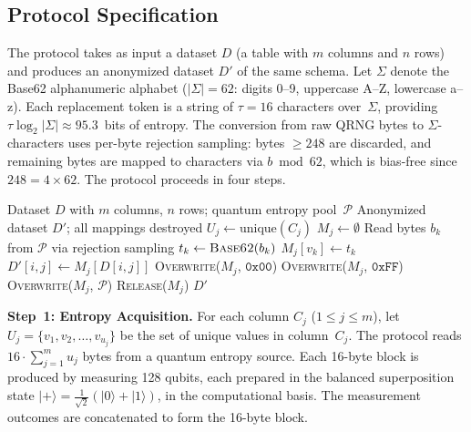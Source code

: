 \documentclass[journal]{IEEEtran}
\begin{document}
\subsection{Protocol Specification}
\label{subsec:spec}

The protocol takes as input a dataset $D$ (a table with $m$ columns and $n$ rows) and produces an anonymized dataset $D'$ of the same schema. Let $\Sigma$ denote the Base62 alphanumeric alphabet ($|\Sigma| = 62$: digits 0--9, uppercase A--Z, lowercase a--z). Each replacement token is a string of $\tau = 16$ characters over~$\Sigma$, providing $\tau \log_2 |\Sigma| \approx 95.3$~bits of entropy. The conversion from raw QRNG bytes to $\Sigma$-characters uses per-byte rejection sampling: bytes $\geq 248$ are discarded, and remaining bytes are mapped to characters via $b \bmod 62$, which is bias-free since $248 = 4 \times 62$. The protocol proceeds in four steps.

\begin{algorithm}[t]
\caption{QRNG-OTP-Destroy}
\label{alg:qrng_otp}
\begin{algorithmic}[1]
\REQUIRE Dataset $D$ with $m$ columns, $n$ rows; quantum entropy pool~$\mathcal{P}$
\ENSURE Anonymized dataset $D'$; all mappings destroyed
    \STATE $U_j \leftarrow \text{unique}(C_j)$ 
    \STATE $M_j \leftarrow \emptyset$ 
        \STATE Read bytes $b_k$ from $\mathcal{P}$ via rejection sampling 
        \STATE $t_k \leftarrow \textsc{Base62}(b_k)$ 
        \STATE $M_j[v_k] \leftarrow t_k$
    \ENDFOR
        \STATE $D'[i,j] \leftarrow M_j[D[i,j]]$
    \ENDFOR
\ENDFOR
{}
    \STATE \textsc{Overwrite}($M_j$, $\texttt{0x00}$) 
    \STATE \textsc{Overwrite}($M_j$, $\texttt{0xFF}$) 
    \STATE \textsc{Overwrite}($M_j$, $\mathcal{P}$) 
    \STATE \textsc{Release}($M_j$)
\ENDFOR
\RETURN $D'$
\end{algorithmic}
\end{algorithm}

\textbf{Step~1: Entropy Acquisition.} For each column $C_j$ ($1 \leq j \leq m$), let $U_j = \{v_1, v_2, \ldots, v_{u_j}\}$ be the set of unique values in column~$C_j$. The protocol reads $16 \cdot \sum_{j=1}^{m} u_j$ bytes from a quantum entropy source. Each 16-byte block is produced by measuring 128 qubits, each prepared in the balanced superposition state $|{+}\rangle = \frac{1}{\sqrt{2}}(|0\rangle + |1\rangle)$, in the computational basis. The measurement outcomes are concatenated to form the 16-byte block.
\end{document}

